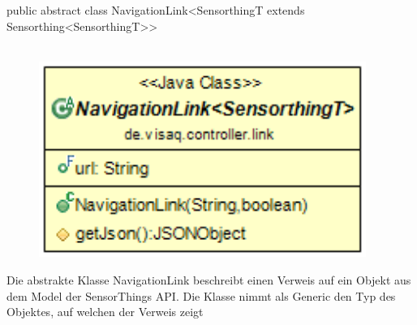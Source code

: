 public abstract class NavigationLink<SensorthingT extends Sensorthing<SensorthingT>>
\\\\
\begin{minipage}{0.3\textwidth}
    \begin{figure}[H]
        {\centering\includegraphics[width=0.95\textwidth]{media/backend/controller/classes/NavigationLink.png}}
    \end{figure}
    \end{minipage} \hfill
\begin{minipage}{0.7\textwidth}
    Die abstrakte Klasse NavigationLink beschreibt einen Verweis auf ein Objekt aus dem Model der \gls{SensorThings API}.
    Die Klasse nimmt als Generic den Typ des Objektes, auf welchen der Verweis zeigt
\end{minipage}


